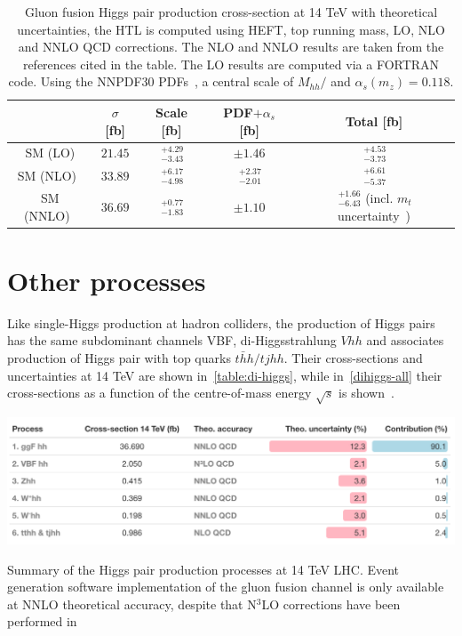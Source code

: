 \begin{table}
	\centering
	\begin{tabular}{ccccc}
		\toprule
		& $ \sigma$	[fb] & Scale [fb] & PDF$+\alpha_s$ [fb]& Total [fb] \\
		\midrule
		SM    (LO)  &  $ 21.45$    &   $ \,^{+4.29}_{-3.43}$   & $\pm 1.46$   &  $ \,^{+4.53}_{-3.73}$ \\
		SM   (NLO)~\cite{Baglio:2012np}  &  $ 33.89$   &   $ \,^{+6.17}_{-4.98}$   & $ \,^{+2.37}_{-2.01}$   &  $ \,^{+6.61}_{-5.37}$ \\
		SM   (NNLO)~\cite{Grazzini:2018bsd}  &  $36.69$    &    $ \,^{+0.77}_{-1.83}$   & $\pm 1.10$   &  $ \,^{+1.66}_{-6.43}$ {\tiny(incl. $m_t$ uncertainty~\cite{Baglio:2020wgt})} \\
		\bottomrule
	\end{tabular}
	\caption{Gluon fusion Higgs pair production cross-section at 14 TeV with theoretical  uncertainties, the HTL is computed using HEFT, top running mass, LO, NLO and NNLO QCD corrections. The NLO and NNLO results are taken from the references cited in the table. The LO results are computed via a FORTRAN code. Using the NNPDF30 PDFs~\cite{Ball:2017nwa}, a central scale of $ M_{hh}/$ and $ \alpha_s(m_z) = 0.118$.}
	\label{ggf_xsres}
\end{table}

\section{Other processes\label{otherhh}  }
\par Like single-Higgs production at hadron colliders, the production of Higgs pairs has the same subdominant channels VBF, di-Higgsstrahlung $ Vhh$ and associates production of Higgs pair with top quarks $t\bar hh /t j hh$. Their cross-sections and uncertainties at 14 TeV are shown in~\autoref{table:di-higgs}, while in~\autoref{dihiggs-all} their cross-sections as a function of the centre-of-mass energy $\sqrt{s}$ is shown~\cite{DiMicco:2019ngk}. 
\begin{table}[htbp!]
	\includegraphics[width=1\textwidth]{hh-table}
	\caption{ Summary of the Higgs pair production processes at 14 TeV LHC. Event generation software implementation of the gluon fusion channel is only available at NNLO theoretical accuracy, despite that N$^3$LO corrections have been performed in~\cite{Chen:2019fhs} \label{table:di-higgs} }
\end{table}
